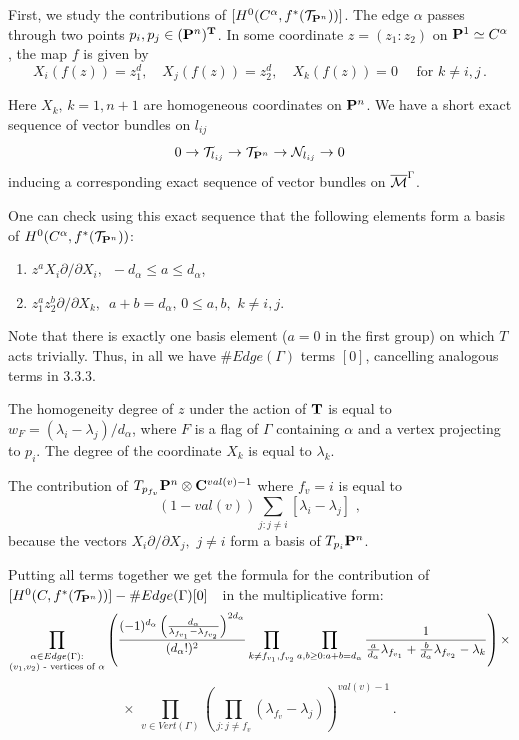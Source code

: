 \documentclass{amsart}
\begin{document}
First, we study the contributions of  $[H^0(C^{\alpha},f^*(\Cal T_{\P^n}))]$.
  The edge $\alpha$ passes through two points $p_i,p_j\in (\P^n)^{\T}$.
In some coordinate $z=(z_1:z_2)$ on $\P^1\simeq C^{\alpha}$, the map $f$
 is given by
$$ X_i(f(z))=z_1^d,\quad X_j(f(z))=z_2^d, \quad X_k(f(z))=0 \quad \text{ for }
k\ne i,j\,.$$

Here $X_k, \,k=1,n+1$ are homogeneous coordinates on $\P^n$.
 We have a short exact sequence of vector bundles on $l_{ij}$
$$0\to\Cal T_{l_{ij}}\to\Cal T_{\P^n}\to\Cal N_{l_{ij}}\to0$$
 inducing a corresponding exact sequence of vector bundles on $\M^{\Gamma}$.



One can check using this exact sequence that the following elements form a
basis of
  $H^0(C^{\alpha},f^*(\Cal T_{\P^n}))$:
\begin{enumerate}
\item $ z^a X_i\partial/\partial X_i,\,\,\,-d_{\alpha}\le a\le d_{\alpha}$,
\item $ z_1^a z_2^b \partial/\partial X_k,\,\,\,a+b=d_{\alpha},\,0\le
a,b,\,\,k\ne i,j$.
\end{enumerate}

Note that there is exactly one basis element ($a=0$ in the first group) on
which $T$ acts trivially. Thus, in all we have $\#Edge(\Gamma)$ terms $[0]$,
cancelling  analogous terms in 3.3.3.

The homogeneity degree of $z$ under the action of $\T$ is equal to
$w_F=(\lambda_i-\lambda_j)/d_{\alpha}$, where $F$ is a flag of $\Gamma$
containing $\alpha$ and a vertex projecting to $p_i$. The degree of the
coordinate $X_k$ is equal to $\lambda_k$.

The contribution of
$T_{p_{f_v}}\P^n\otimes\C^{val(v)-1}$ where $f_v=i$ is equal to
$$(1-val(v))\sum_{j:j\ne i} [\lambda_i-\lambda_j]\,\,,$$
because the vectors $X_i\partial/\partial X_j,\,\,j\ne i$ form a  basis of
$T_{p_i}\P^n$.

Putting all terms together we get the formula for the contribution of\linebreak
 $[H^0(C,f^*(\Cal T_{\P^n}))]-
\# Edge(\Gamma)[0]\,\,\,\,$ in the multiplicative form:
$$\prod_{
\substack{
\alpha\in Edge(\Gamma):\\
(v_1,v_2)\text{ -  vertices of }\alpha
}}
\left(
\frac{
(-1)^{d_{\alpha}}\left(
\frac{d_{\alpha}}{\l_{f_{v_1}}-\l_{f_{v_2}}}\right)^{2d_{\alpha}}}
{(d_{\alpha}!)^2}
\prod_{k\ne f_{v_1},f_{v_2}}
\prod_{a,b\ge 0:a+b=d_{\alpha}}\frac{1}{\frac{a}{d_\alpha}\l_{f_{v_1}}+
\frac{b}{d_\alpha}\l_{f_{v_2}}-\l_k}
\right)\times$$
$$\times\,\,
\prod_{v\in Vert(\Gamma)} \left(\prod_{j:j\ne
f_v}(\lambda_{f_v}-\lambda_j)\right)^{val(v)-1}\,.$$
\end{document}
